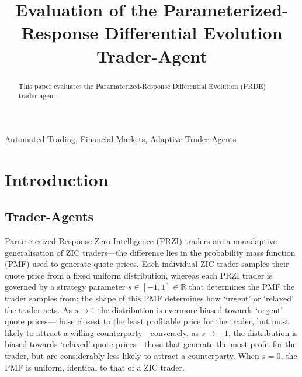 \documentclass[conference]{IEEEtran}
\begin{document}
\title{Evaluation of the Parameterized-Response Differential Evolution Trader-Agent}

\author{
}

\maketitle

\begin{abstract}
This paper evaluates the Paramaterized-Response Differential Evolution (PRDE) trader-agent.
\end{abstract}

\begin{IEEEkeywords}
Automated Trading, Financial Markets, Adaptive Trader-Agents
\end{IEEEkeywords}

\section{Introduction}

\subsection{Trader-Agents}

Parameterized-Response Zero Intelligence (PRZI) traders \cite{CliffMetapopulation} are a nonadaptive generalisation of ZIC \cite{GodeSunder} traders---the difference lies in the probability mass function (PMF) used to generate quote prices.
Each individual ZIC trader samples their quote price from a fixed uniform distribution, whereas each PRZI trader is governed by a strategy parameter $s\in[-1, 1]\in\mathbb{R}$ that determines the PMF the trader samples from; the shape of this PMF determines how `urgent' or `relaxed' the trader acts.
As $s\to1$ the distribution is evermore biased towards `urgent' quote prices---those closest to the least profitable price for the trader, but most likely to attract a willing counterparty---conversely, as $s\to-1$, the distribution is biased towards `relaxed' quote prices---those that generate the most profit for the trader, but are considerably less likely to attract a counterparty.
When $s=0$, the PMF is uniform, identical to that of a ZIC trader.
\end{document}
